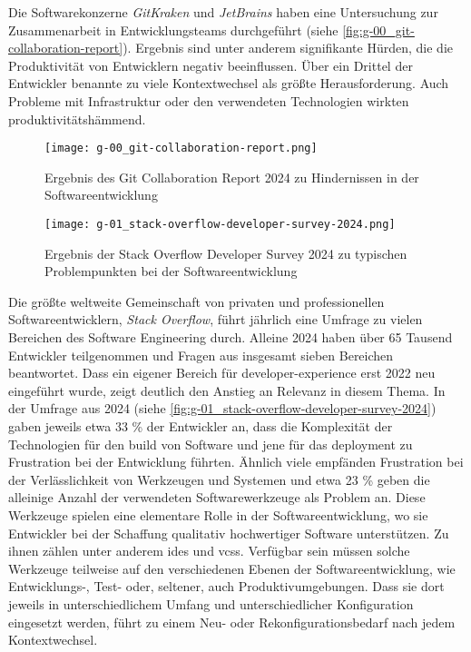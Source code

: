 Die Softwarekonzerne \textit{GitKraken} und \textit{JetBrains} haben eine Untersuchung zur Zusammenarbeit in Entwicklungsteams durchgeführt (siehe \autoref{fig:g-00_git-collaboration-report}). Ergebnis sind unter anderem signifikante Hürden, die die Produktivität von Entwicklern negativ beeinflussen. Über ein Drittel der Entwickler benannte zu viele Kontextwechsel als größte Herausforderung. Auch Probleme mit Infrastruktur oder den verwendeten Technologien wirkten produktivitätshämmend. \cite{213:2024-State-of-Git-Collaboration}

\pagebreak[4]

\begin{figure}[h]
    \centering
    \begin{minipage}[b]{0.39\textwidth}
        \centering
        \texttt{[image: g-00\_git-collaboration-report.png]}
        \caption{Ergebnis des Git Collaboration Report 2024 zu Hindernissen in der Softwareentwicklung \cite{213:2024-State-of-Git-Collaboration}}
        \label{fig:g-00_git-collaboration-report}
    \end{minipage}
    \hfill
    \begin{minipage}[b]{0.59\textwidth}
        \centering
        \texttt{[image: g-01\_stack-overflow-developer-survey-2024.png]}
        \caption{Ergebnis der Stack Overflow Developer Survey 2024 zu typischen Problempunkten bei der Softwareentwicklung \cite{212:Developer-Survey}}
        \label{fig:g-01_stack-overflow-developer-survey-2024}
    \end{minipage}
\end{figure}

Die größte weltweite Gemeinschaft von privaten und professionellen Softwareentwicklern, \textit{Stack Overflow}, führt jährlich eine Umfrage zu vielen Bereichen des Software Engineering durch. Alleine 2024 haben über 65 Tausend Entwickler teilgenommen und Fragen aus insgesamt sieben Bereichen beantwortet. Dass ein eigener Bereich für \Gls{developer-experience} erst 2022 neu eingeführt wurde, zeigt deutlich den Anstieg an Relevanz in diesem Thema. \cite{212:Developer-Survey} In der Umfrage aus 2024 (siehe \autoref{fig:g-01_stack-overflow-developer-survey-2024}) gaben jeweils etwa 33 \% der Entwickler an, dass die Komplexität der Technologien für den \Gls{build} von Software und jene für das \Gls{deployment} zu Frustration bei der Entwicklung führten. Ähnlich viele empfänden Frustration bei der Verlässlichkeit von Werkzeugen und Systemen und etwa 23 \% geben die alleinige Anzahl der verwendeten Softwarewerkzeuge als Problem an. \cite{206:Developer-Survey-2024} Diese Werkzeuge spielen eine elementare Rolle in der Softwareentwicklung, wo sie Entwickler bei der Schaffung qualitativ hochwertiger Software unterstützen. Zu ihnen zählen unter anderem \glspl{ide} und \glspl{vcs}. \cite{014:Managing-Container-based-Software-Development-Environments} Verfügbar sein müssen solche Werkzeuge teilweise auf den verschiedenen Ebenen der Softwareentwicklung, wie Entwicklungs-, Test- oder, seltener, auch Produktivumgebungen. Dass sie dort jeweils in unterschiedlichem Umfang und unterschiedlicher Konfiguration eingesetzt werden, führt zu einem Neu- oder Rekonfigurationsbedarf nach jedem Kontextwechsel. \cite{003:Infrastructure-from-Code}

